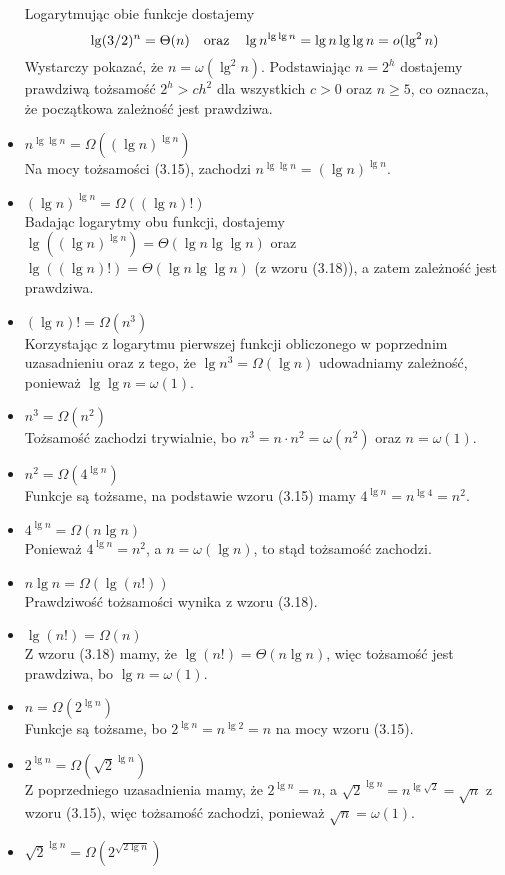 \begin{itemize}
	Logarytmując obie funkcje dostajemy
	\[
		\lg(3/2)^n = \Theta(n) \quad\hbox{oraz}\quad \lg n^{\lg\lg n} = \lg n\lg\lg n = o(\lg^2n)
	\]
	Wystarczy pokazać, że $n=\omega(\lg^2n)$. Podstawiając $n=2^h$ dostajemy prawdziwą tożsamość $2^h>ch^2$ dla wszystkich $c>0$ oraz $n\ge5$, co oznacza, że początkowa zależność jest prawdziwa.
\item $n^{\lg\lg n}=\Omega\left((\lg n)^{\lg n}\right)$ \\
	Na mocy tożsamości (3.15), zachodzi $n^{\lg\lg n}=(\lg n)^{\lg n}$.
\item $(\lg n)^{\lg n}=\Omega((\lg n)!)$ \\
	Badając logarytmy obu funkcji, dostajemy $\lg\left((\lg n)^{\lg n}\right) = \Theta(\lg n\lg\lg n)$ oraz $\lg((\lg n)!)=\Theta(\lg n\lg\lg n)$ (z wzoru (3.18)), a zatem zależność jest prawdziwa.
\item $(\lg n)!=\Omega(n^3)$ \\
	Korzystając z logarytmu pierwszej funkcji obliczonego w poprzednim uzasadnieniu oraz z tego, że $\lg n^3=\Omega(\lg n)$ udowadniamy zależność, ponieważ $\lg\lg n=\omega(1)$.
\item $n^3=\Omega(n^2)$ \\
	Tożsamość zachodzi trywialnie, bo $n^3=n\cdot n^2=\omega(n^2)$ oraz $n=\omega(1)$.
\item $n^2=\Omega(4^{\lg n})$ \\
	Funkcje są tożsame, na podstawie wzoru (3.15) mamy $4^{\lg n}=n^{\lg 4}=n^2$.
\item $4^{\lg n}=\Omega(n\lg n)$ \\
	Ponieważ $4^{\lg n}=n^2$, a $n=\omega(\lg n)$, to stąd tożsamość zachodzi.
\item $n\lg n=\Omega(\lg(n!))$ \\
	Prawdziwość tożsamości wynika z wzoru (3.18).
\item $\lg(n!)=\Omega(n)$ \\
	Z wzoru (3.18) mamy, że $\lg(n!)=\Theta(n\lg n)$, więc tożsamość jest prawdziwa, bo $\lg n=\omega(1)$.
\item $n=\Omega(2^{\lg n})$ \\
	Funkcje są tożsame, bo $2^{\lg n}=n^{\lg2}=n$ na mocy wzoru (3.15).
\item $2^{\lg n}=\Omega\left(\sqrt{2}^{\lg n}\right)$ \\
	Z poprzedniego uzasadnienia mamy, że $2^{\lg n}=n$, a $\sqrt{2}^{\lg n}=n^{\lg\sqrt{2}}=\sqrt{n}$ z wzoru (3.15), więc tożsamość zachodzi, ponieważ $\sqrt{n}=\omega(1)$.
\item $\sqrt{2}^{\lg n}=\Omega\left(2^{\sqrt{2\lg n}}\right)$ \\

\end{itemize}
